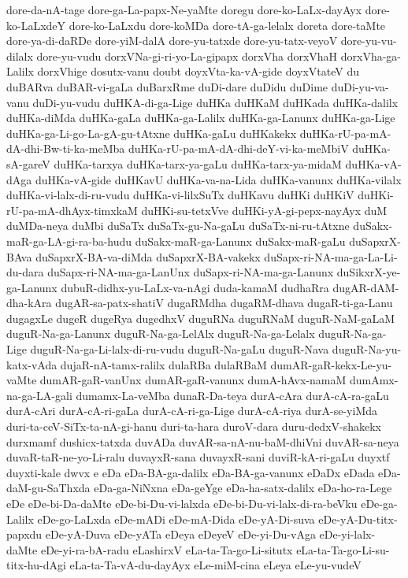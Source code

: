 {dore-da-nA-tage
dore-ga-La-papx-Ne-yaMte
doregu
dore-ko-LaLx-dayAyx
dore-ko-LaLxdeY
dore-ko-LaLxdu
dore-koMDa
dore-tA-ga-lelalx
doreta
dore-taMte
dore-ya-di-daRDe
dore-yiM-dalA
dore-yu-tatxde
dore-yu-tatx-veyoV
dore-yu-vu-dilalx
dore-yu-vudu
dorxVNa-gi-ri-yo-La-gipapx
dorxVha
dorxVhaH
dorxVha-ga-Lalilx
dorxVhige
dosutx-vanu
doubt
doyxVta-ka-vA-gide
doyxVtateV
du
duBARva
duBAR-vi-gaLa
duBarxRme
duDi-dare
duDidu
duDime
duDi-yu-va-vanu
duDi-yu-vudu
duHKA-di-ga-Lige
duHKa
duHKaM
duHKada
duHKa-dalilx
duHKa-diMda
duHKa-gaLa
duHKa-ga-Lalilx
duHKa-ga-Lanunx
duHKa-ga-Lige
duHKa-ga-Li-go-La-gA-gu-tAtxne
duHKa-gaLu
duHKakekx
duHKa-rU-pa-mA-dA-dhi-Bw-ti-ka-meMba
duHKa-rU-pa-mA-dA-dhi-deY-vi-ka-meMbiV
duHKa-sA-gareV
duHKa-tarxya
duHKa-tarx-ya-gaLu
duHKa-tarx-ya-midaM
duHKa-vA-dAga
duHKa-vA-gide
duHKavU
duHKa-va-na-Lida
duHKa-vanunx
duHKa-vilalx
duHKa-vi-lalx-di-ru-vudu
duHKa-vi-lilxSuTx
duHKavu
duHKi
duHKiV
duHKi-rU-pa-mA-dhAyx-timxkaM
duHKi-su-tetxVve
duHKi-yA-gi-pepx-nayAyx
duM
duMDa-neya
duMbi
duSaTx
duSaTx-gu-Na-gaLu
duSaTx-ni-ru-tAtxne
duSakx-maR-ga-LA-gi-ra-ba-hudu
duSakx-maR-ga-Lanunx
duSakx-maR-gaLu
duSapxrX-BAva
duSapxrX-BA-va-diMda
duSapxrX-BA-vakekx
duSapx-ri-NA-ma-ga-La-Li-du-dara
duSapx-ri-NA-ma-ga-LanUnx
duSapx-ri-NA-ma-ga-Lanunx
duSikxrX-ye-ga-Lanunx
dubuR-didhx-yu-LaLx-va-nAgi
duda-kamaM
dudhaRra
dugAR-dAM-dha-kAra
dugAR-sa-patx-shatiV
dugaRMdha
dugaRM-dhava
dugaR-ti-ga-Lanu
dugagxLe
dugeR
dugeRya
dugedhxV
duguRNa
duguRNaM
duguR-NaM-gaLaM
duguR-Na-ga-Lanunx
duguR-Na-ga-LelAlx
duguR-Na-ga-Lelalx
duguR-Na-ga-Lige
duguR-Na-ga-Li-lalx-di-ru-vudu
duguR-Na-gaLu
duguR-Nava
duguR-Na-yu-katx-vAda
dujaR-nA-tamx-ralilx
dulaRBa
dulaRBaM
dumAR-gaR-kekx-Le-yu-vaMte
dumAR-gaR-vanUnx
dumAR-gaR-vanunx
dumA-hAvx-namaM
dumAmx-na-ga-LA-gali
dumamx-La-veMba
dunaR-Da-teya
durA-cAra
durA-cA-ra-gaLu
durA-cAri
durA-cA-ri-gaLa
durA-cA-ri-ga-Lige
durA-cA-riya
durA-se-yiMda
duri-ta-ceV-SiTx-ta-nA-gi-hanu
duri-ta-hara
duroV-dara
duru-dedxV-shakekx
durxmamf
dushicx-tatxda
duvADa
duvAR-sa-nA-nu-baM-dhiVni
duvAR-sa-neya
duvaR-taR-ne-yo-Li-ralu
duvayxR-sana
duvayxR-sani
duviR-kA-ri-gaLu
duyxtf
duyxti-kale
dwvx
e
eDa
eDa-BA-ga-dalilx
eDa-BA-ga-vanunx
eDaDx
eDada
eDa-daM-gu-SaThxda
eDa-ga-NiNxna
eDa-geYge
eDa-ha-satx-dalilx
eDa-ho-ra-Lege
eDe
eDe-bi-Da-daMte
eDe-bi-Du-vi-lalxda
eDe-bi-Du-vi-lalx-di-ra-beVku
eDe-ga-Lalilx
eDe-go-LaLxda
eDe-mADi
eDe-mA-Dida
eDe-yA-Di-suva
eDe-yA-Du-titx-papxdu
eDe-yA-Duva
eDe-yATa
eDeya
eDeyeV
eDe-yi-Du-vAga
eDe-yi-lalx-daMte
eDe-yi-ra-bA-radu
eLashirxV
eLa-ta-Ta-go-Li-situtx
eLa-ta-Ta-go-Li-su-titx-hu-dAgi
eLa-ta-Ta-vA-du-dayAyx
eLe-miM-cina
eLeya
eLe-yu-vudeV
}
